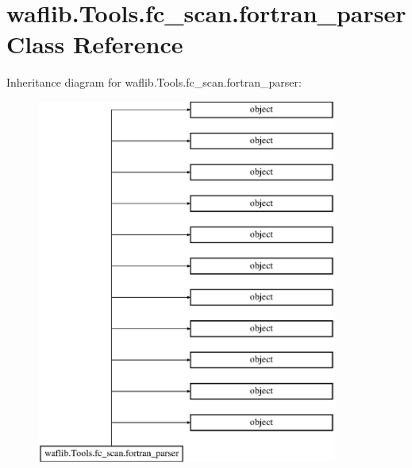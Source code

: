 \hypertarget{classwaflib_1_1_tools_1_1fc__scan_1_1fortran__parser}{}\section{waflib.\+Tools.\+fc\+\_\+scan.\+fortran\+\_\+parser Class Reference}
\label{classwaflib_1_1_tools_1_1fc__scan_1_1fortran__parser}
Inheritance diagram for waflib.\+Tools.\+fc\+\_\+scan.\+fortran\+\_\+parser\+:\begin{figure}[H]
\begin{center}
\leavevmode
\includegraphics[height=12.000000cm]{classwaflib_1_1_tools_1_1fc__scan_1_1fortran__parser}
\end{center}
\end{figure}
